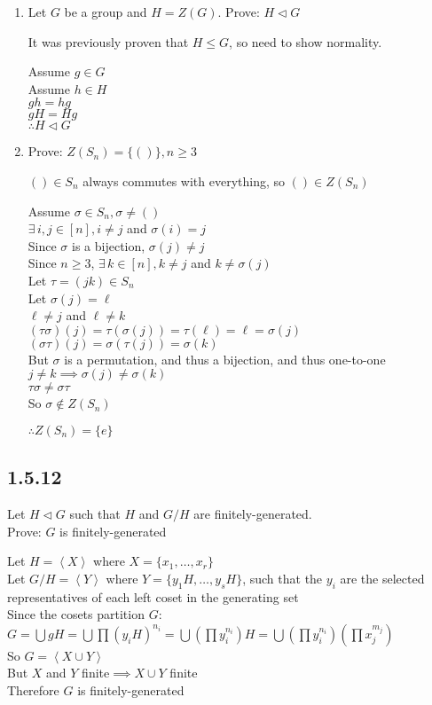 \documentclass[letterpaper,12pt,fleqn]{article}
\newcommand{\cycle}[1]{\left<#1\right>}
\newcommand{\n}{\mathrel{\triangleleft}}
\renewcommand{\o}{\sigma}
\renewcommand{\t}{\tau}
\begin{document}
\begin{enumerate}[label={\alph*)}]
\item Let $G$ be a group and $H=Z(G)$. Prove: $H\n G$

  It was previously proven that $H\le G$, so need to show normality.

  Assume $g\in G$ \\
  Assume $h\in H$ \\
  $gh=hg$ \\
  $gH=Hg$ \\
  $\therefore H\n G$

\item Prove: $Z(S_n)=\{()\},n\ge3$

  $()\in S_n$ always commutes with everything, so $()\in Z(S_n)$

  Assume $\o\in S_n,\o\ne()$ \\
  $\exists\,i,j\in[n],i\ne j$ and $\o(i)=j$ \\
  Since $\o$ is a bijection, $\o(j)\ne j$ \\
  Since $n\ge3$, $\exists\,k\in[n],k\ne j$ and $k\ne\o(j)$ \\
  Let $\t=(jk)\in S_n$ \\
  Let $\o(j)=\ell$ \\
  $\ell\ne j$ and $\ell\ne k$ \\
  $(\t\o)(j)=\t(\o(j))=\t(\ell)=\ell=\o(j)$ \\
  $(\o\t)(j)=\o(\t(j))=\o(k)$ \\
  But $\o$ is a permutation, and thus a bijection, and thus one-to-one \\
  $j\ne k\implies\o(j)\ne\o(k)$ \\
  $\t\o\ne\o\t$ \\
  So $\o\notin Z(S_n)$
  
  $\therefore Z(S_n)=\{e\}$
\end{enumerate}

\subsection*{1.5.12}

Let $H\n G$ such that $H$ and $G/H$ are finitely-generated. \\
Prove: $G$ is finitely-generated

Let $H=\cycle{X}$ where $X=\{x_1,\ldots,x_r\}$ \\
Let $G/H=\cycle{Y}$ where $Y=\{y_1H,\ldots,y_sH\}$, such that the $y_i$ are the
selected representatives of each left coset in the generating set \\
Since the cosets partition $G$: \\
$G=\bigcup gH=\bigcup\prod(y_iH)^{n_i}=\bigcup\left(\prod y_i^{n_i}\right)H=
\bigcup\left(\prod y_i^{n_i}\right)\left(\prod x_j^{m_j}\right)$ \\
So $G=\cycle{X\cup Y}$ \\
But $X$ and $Y$ finite$\implies X\cup Y$ finite \\
Therefore $G$ is finitely-generated
\end{document}
